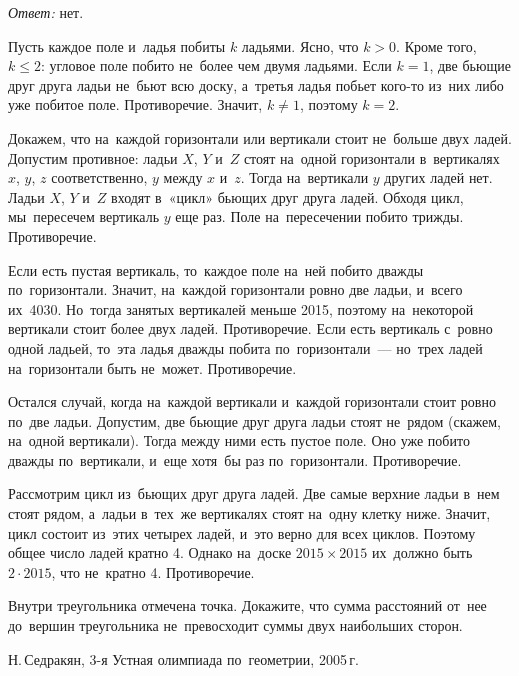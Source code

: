 \ifincludesolutions
\emph{Ответ:} нет.
\par
Пусть каждое поле и~ладья побиты $k$ ладьями.
Ясно, что $k > 0$.
Кроме того, $k \leq 2$: угловое поле побито не~более чем двумя ладьями.
Если $k = 1$, две бьющие друг друга ладьи не~бьют всю доску, а~третья ладья
побьет кого-то из~них либо уже побитое поле.
Противоречие.
Значит, $k \neq 1$, поэтому $k = 2$.
\par
Докажем, что на~каждой горизонтали или вертикали стоит не~больше двух ладей.
Допустим противное: ладьи $X$, $Y$ и~$Z$ стоят на~одной горизонтали
в~вертикалях $x$, $y$, $z$ соответственно, $y$ между $x$ и~$z$.
Тогда на~вертикали $y$ других ладей нет.
Ладьи $X$, $Y$ и~$Z$ входят в~«цикл» бьющих друг друга ладей.
Обходя цикл, мы~пересечем вертикаль $y$ еще раз.
Поле на~пересечении побито трижды.
Противоречие.
\par
Если есть пустая вертикаль, то~каждое поле на~ней побито дважды по~горизонтали.
Значит, на~каждой горизонтали ровно две ладьи, и~всего их~4030.
Но~тогда занятых вертикалей меньше 2015, поэтому на~некоторой вертикали стоит
более двух ладей.
Противоречие.
Если есть вертикаль с~ровно одной ладьей, то~эта ладья дважды побита
по~горизонтали~— но~трех ладей на~горизонтали быть не~может.
Противоречие.
\par
Остался случай, когда на~каждой вертикали и~каждой горизонтали стоит ровно
по~две ладьи.
Допустим, две бьющие друг друга ладьи стоят не~рядом (скажем, на~одной
вертикали).
Тогда между ними есть пустое поле.
Оно уже побито дважды по~вертикали, и~еще хотя~бы раз по~горизонтали.
Противоречие.
\par
Рассмотрим цикл из~бьющих друг друга ладей.
Две самые верхние ладьи в~нем стоят рядом, а~ладьи в~тех~же вертикалях стоят
на~одну клетку ниже.
Значит, цикл состоит из~этих четырех ладей, и~это верно для всех циклов.
Поэтому общее число ладей кратно 4.
Однако на~доске $2015 \times 2015$ их~должно быть $2 \cdot 2015$, что
не~кратно 4.
Противоречие.
\fi %

\begin{problems}

\item
\ifincludesolutions\label{olympiad/g9-1/r1:n4:problem}\fi
Внутри треугольника отмечена точка.
Докажите, что сумма расстояний от~нее до~вершин треугольника не~превосходит
суммы двух наибольших сторон.
\begingroup\em\small\par\strut\hfill
    Н.\,Седракян, 3-я Устная олимпиада по~геометрии, 2005\,г.
\endgroup
\end{problems}

